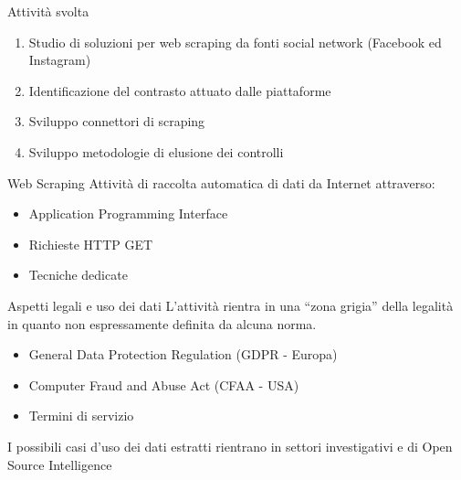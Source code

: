 \setlength{\tabcolsep}{10pt}

\begin{frame}{Attivit\`a svolta}
\begin{enumerate}

    \item Studio di soluzioni per web scraping da fonti social network (Facebook ed Instagram)
    \item Identificazione del contrasto attuato dalle piattaforme
    \item Sviluppo connettori di scraping
    \item Sviluppo metodologie di elusione dei controlli
\end{enumerate}
    
\end{frame}



\begin{frame}{Web Scraping}
Attività di \alert{raccolta automatica} di dati da Internet attraverso:
\begin{itemize}
    \item Application Programming Interface
    \item Richieste HTTP GET
    \item Tecniche dedicate
\end{itemize}\leavevmode\newline

\begin{figure}
  \begin{center}
  
\end{center}
\end{figure}
\end{frame}


\begin{frame}{Aspetti legali e uso dei dati}
L'attivit\`a rientra in una \alert{``zona grigia''} della legalit\`a in quanto non espressamente definita da alcuna norma.
\begin{itemize}
    \item General Data Protection Regulation (GDPR - Europa)
    \item Computer Fraud and Abuse Act (CFAA - USA)
    \item Termini di servizio
\end{itemize}\leavevmode\newline
I possibili \alert{casi d'uso} dei dati estratti rientrano in settori investigativi e di Open Source Intelligence
\end{frame}




